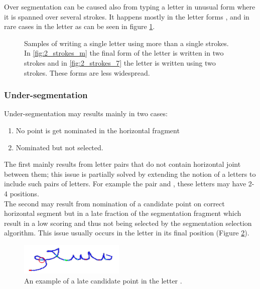 \documentclass[journal,compsoc]{IEEEtran}
\begin{document}
Over segmentation can be caused also from typing a letter in unusual form where it is spanned over several strokes. It happens mostly in the letter forms ,  and in rare cases in the letter  as can be seen in figure \ref{fig:multiple_strokes_letter}.

\begin{figure}[h]
\centering
    \caption{Samples of writing a single letter using more than a single strokes. In \ref{fig:2_strokes_m} the final form of the letter  is written in two strokes and in \ref{fig:2_strokes_7} the letter  is written using two strokes. These forms are less widespread.}
   \label{fig:multiple_strokes_letter}
\end{figure}

\subsubsection{Under-segmentation}
Under-segmentation may results mainly in two cases:
\begin{enumerate}
\item No point is get nominated in the horizontal fragment
\item Nominated but not selected.
\end{enumerate}

The first mainly results from letter pairs that do not contain horizontal joint between them; this issue is partially solved by extending the notion of a letters to include such pairs of letters. For example the pair  and , these letters may have 2-4 positions. \\

The second may result from nomination of a candidate point on correct horizontal segment but in a late fraction of the segmentation fragment which result in a low scoring and thus not being selected by the segmentation selection algorithm. This issue usually occurs in the letter  in its final position (Figure \ref{fig:undersegmentation_w}).

\begin{figure}[h]
\centering
\includegraphics[width=5cm]{./figures/undersegmentation_w}
\caption{An example of a late candidate point in the letter .}
\label{fig:undersegmentation_w}
\end{figure}
\end{document}
